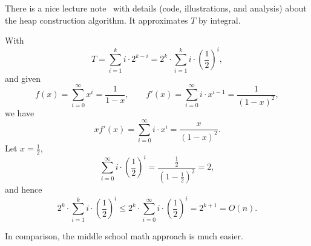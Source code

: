 \documentclass[11pt, oneside]{article}   	%
\begin{document}
There is a nice lecture note~\cite{ref:cmsc251} with details (code, illustrations, and analysis) about the heap construction algorithm. It approximates $T$ by integral. 

With
\[T = \sum_{i=1}^{k} i\cdot 2^{k-i} = 2^k\cdot \sum_{i=1}^{k} i\cdot \left(\frac{1}{2}\right)^i,\]
and given \[ f(x) = \sum_{i=0}^{\infty} x^i = \frac{1}{1-x}, \qquad f'(x) = \sum_{i=0}^{\infty} i\cdot x^{i-1} = \frac{1}{(1-x)^2},\]
we have 
\[xf'(x) = \sum_{i=0}^{\infty} i\cdot x^i = \frac{x}{(1-x)^2}.\]
Let $x=\frac{1}{2}$, 
\[\sum_{i=0}^{\infty} i\cdot \left(\frac{1}{2}\right)^i = \frac{\frac{1}{2}}{(1-\frac{1}{2})^2} = 2,\]
and hence
\[2^k\cdot \sum_{i=1}^{k} i\cdot \left(\frac{1}{2}\right)^i \le 2^k\cdot \sum_{i=0}^{\infty} i\cdot  \left(\frac{1}{2}\right)^i  = 2^{k+1} = O(n).\]

In comparison, the middle school math approach is much easier.



\end{document}
